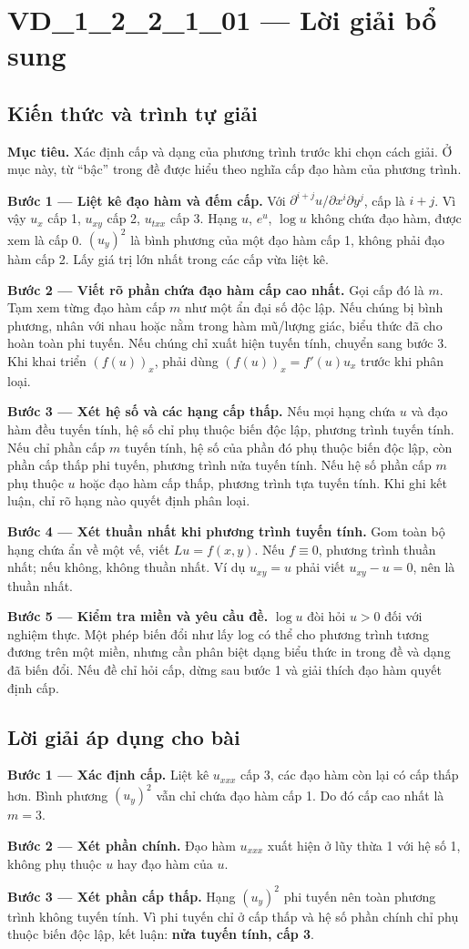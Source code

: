\documentclass[10pt,a4paper]{article}
\begin{document}
\section*{VD\_1\_2\_2\_1\_01 — Lời giải bổ sung}
\subsection*{Kiến thức và trình tự giải}
\textbf{Mục tiêu.} Xác định cấp và dạng của phương trình trước khi chọn cách giải. Ở mục này, từ “bậc” trong đề được hiểu theo nghĩa cấp đạo hàm của phương trình.

\textbf{Bước 1 — Liệt kê đạo hàm và đếm cấp.} Với $\partial^{i+j}u/\partial x^i\partial y^j$, cấp là $i+j$. Vì vậy $u_x$ cấp 1, $u_{xy}$ cấp 2, $u_{txx}$ cấp 3. Hạng $u$, $e^u$, $\log u$ không chứa đạo hàm, được xem là cấp 0. $(u_y)^2$ là bình phương của một đạo hàm cấp 1, không phải đạo hàm cấp 2. Lấy giá trị lớn nhất trong các cấp vừa liệt kê.

\textbf{Bước 2 — Viết rõ phần chứa đạo hàm cấp cao nhất.} Gọi cấp đó là $m$. Tạm xem từng đạo hàm cấp $m$ như một ẩn đại số độc lập. Nếu chúng bị bình phương, nhân với nhau hoặc nằm trong hàm mũ/lượng giác, biểu thức đã cho hoàn toàn phi tuyến. Nếu chúng chỉ xuất hiện tuyến tính, chuyển sang bước 3. Khi khai triển $(f(u))_x$, phải dùng $(f(u))_x=f'(u)u_x$ trước khi phân loại.

\textbf{Bước 3 — Xét hệ số và các hạng cấp thấp.} Nếu mọi hạng chứa $u$ và đạo hàm đều tuyến tính, hệ số chỉ phụ thuộc biến độc lập, phương trình tuyến tính. Nếu chỉ phần cấp $m$ tuyến tính, hệ số của phần đó phụ thuộc biến độc lập, còn phần cấp thấp phi tuyến, phương trình nửa tuyến tính. Nếu hệ số phần cấp $m$ phụ thuộc $u$ hoặc đạo hàm cấp thấp, phương trình tựa tuyến tính. Khi ghi kết luận, chỉ rõ hạng nào quyết định phân loại.

\textbf{Bước 4 — Xét thuần nhất khi phương trình tuyến tính.} Gom toàn bộ hạng chứa ẩn về một vế, viết $Lu=f(x,y)$. Nếu $f\equiv0$, phương trình thuần nhất; nếu không, không thuần nhất. Ví dụ $u_{xy}=u$ phải viết $u_{xy}-u=0$, nên là thuần nhất.

\textbf{Bước 5 — Kiểm tra miền và yêu cầu đề.} $\log u$ đòi hỏi $u>0$ đối với nghiệm thực. Một phép biến đổi như lấy log có thể cho phương trình tương đương trên một miền, nhưng cần phân biệt dạng biểu thức in trong đề và dạng đã biến đổi. Nếu đề chỉ hỏi cấp, dừng sau bước 1 và giải thích đạo hàm quyết định cấp.
\subsection*{Lời giải áp dụng cho bài}
\textbf{Bước 1 — Xác định cấp.} Liệt kê $u_{xxx}$ cấp 3, các đạo hàm còn lại có cấp thấp hơn. Bình phương $(u_y)^2$ vẫn chỉ chứa đạo hàm cấp 1. Do đó cấp cao nhất là $m=3$.

\textbf{Bước 2 — Xét phần chính.} Đạo hàm $u_{xxx}$ xuất hiện ở lũy thừa 1 với hệ số 1, không phụ thuộc $u$ hay đạo hàm của $u$.

\textbf{Bước 3 — Xét phần cấp thấp.} Hạng $(u_y)^2$ phi tuyến nên toàn phương trình không tuyến tính. Vì phi tuyến chỉ ở cấp thấp và hệ số phần chính chỉ phụ thuộc biến độc lập, kết luận: \textbf{nửa tuyến tính, cấp 3}.
\end{document}
